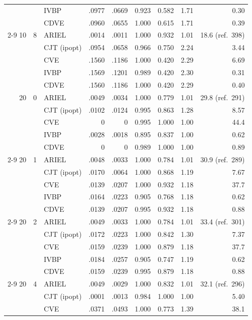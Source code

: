 \begin{table}[htbp]
\begin{tabular}{rrlrrrrrr}
 &  & IVBP & .0977 & .0669 & 0.923 & 0.582 & 1.71 & 0.30 \\
 &  & CDVE & .0960 & .0655 & 1.000 & 0.615 & 1.71 & 0.39 \\
\cmidrule(l){2-9}
10 & 8 & ARIEL & .0014 & .0011 & 1.000 & 0.932 & 1.01 & 18.6 (ref.\ 398) \\
 &  & CJT (ipopt) & .0954 & .0658 & 0.966 & 0.750 & 2.24 & 3.44 \\
 &  & CVE & .1560 & .1186 & 1.000 & 0.420 & 2.29 & 6.69 \\
 &  & IVBP & .1569 & .1201 & 0.989 & 0.420 & 2.30 & 0.31 \\
 &  & CDVE & .1560 & .1186 & 1.000 & 0.420 & 2.29 & 0.40 \\
\midrule
20 & 0 & ARIEL & .0049 & .0034 & 1.000 & 0.779 & 1.01 & 29.8 (ref.\ 291) \\
 &  & CJT (ipopt) & .0102 & .0124 & 0.995 & 0.863 & 1.28 & 8.57 \\
 &  & CVE & 0 & 0 & 0.995 & 1.000 & 1.00 & 44.4 \\
 &  & IVBP & .0028 & .0018 & 0.895 & 0.837 & 1.00 & 0.62 \\
 &  & CDVE & 0 & 0 & 0.989 & 1.000 & 1.00 & 0.89 \\
\cmidrule(l){2-9}
20 & 1 & ARIEL & .0048 & .0033 & 1.000 & 0.784 & 1.01 & 30.9 (ref.\ 289) \\
 &  & CJT (ipopt) & .0170 & .0064 & 1.000 & 0.868 & 1.19 & 7.67 \\
 &  & CVE & .0139 & .0207 & 1.000 & 0.932 & 1.18 & 37.7 \\
 &  & IVBP & .0164 & .0223 & 0.905 & 0.768 & 1.18 & 0.62 \\
 &  & CDVE & .0139 & .0207 & 0.995 & 0.932 & 1.18 & 0.88 \\
\cmidrule(l){2-9}
20 & 2 & ARIEL & .0049 & .0033 & 1.000 & 0.784 & 1.01 & 33.4 (ref.\ 301) \\
 &  & CJT (ipopt) & .0172 & .0223 & 1.000 & 0.842 & 1.30 & 7.37 \\
 &  & CVE & .0159 & .0239 & 1.000 & 0.879 & 1.18 & 37.7 \\
 &  & IVBP & .0184 & .0257 & 0.905 & 0.747 & 1.19 & 0.62 \\
 &  & CDVE & .0159 & .0239 & 0.995 & 0.879 & 1.18 & 0.88 \\
\cmidrule(l){2-9}
20 & 4 & ARIEL & .0049 & .0029 & 1.000 & 0.832 & 1.01 & 32.1 (ref.\ 296) \\
 &  & CJT (ipopt) & .0001 & .0013 & 0.984 & 1.000 & 1.00 & 5.40 \\
 &  & CVE & .0371 & .0493 & 1.000 & 0.773 & 1.39 & 38.1 \\

\end{tabular}
\end{table}
